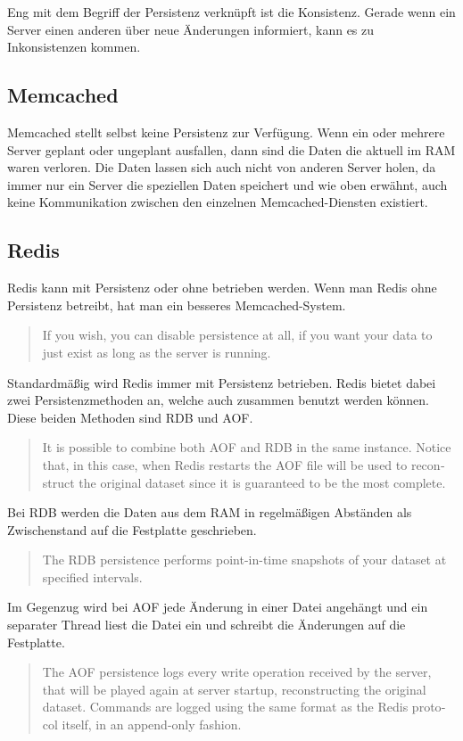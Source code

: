 Eng mit dem Begriff der Persistenz verknüpft ist die Konsistenz. Gerade wenn
ein Server einen anderen über neue Änderungen informiert, kann es zu
Inkonsistenzen kommen.

\subsection{Memcached}
Memcached stellt selbst keine Persistenz zur Verfügung. Wenn ein oder mehrere
Server geplant oder ungeplant ausfallen, dann sind die Daten die aktuell im
\gls{RAM} waren verloren. Die Daten lassen sich auch nicht von anderen Server
holen, da immer nur ein Server die speziellen Daten speichert und wie oben
erwähnt, auch keine Kommunikation zwischen den einzelnen Memcached-Diensten
existiert.

\subsection{Redis}
Redis kann mit Persistenz oder ohne betrieben werden. Wenn man Redis ohne
Persistenz betreibt, hat man ein besseres Memcached-System.

\foreignblockquote{english}[\cite{Redis2017}]{If you wish, you can
disable persistence at all, if you want your data to just exist as long as the
server is running.}

Standardmäßig wird Redis immer mit Persistenz betrieben. Redis bietet dabei
zwei Persistenzmethoden an, welche auch zusammen benutzt werden können. Diese
beiden Methoden sind \gls{RDB} und \gls{AOF}.

\foreignblockquote{english}[\cite{Redis2017}]{It is possible to combine both
AOF and RDB in the same instance. Notice that, in this case, when Redis
restarts the AOF file will be used to reconstruct the original dataset since it
is guaranteed to be the most complete.}

Bei \gls{RDB} werden die Daten aus dem \gls{RAM} in regelmäßigen Abständen als
Zwischenstand auf die Festplatte geschrieben.

\foreignblockquote{english}[\cite{Redis2017}]{The RDB persistence performs
point-in-time snapshots of your dataset at specified intervals.}

Im Gegenzug wird bei \gls{AOF} jede Änderung in einer Datei angehängt und ein
separater Thread liest die Datei ein und schreibt die Änderungen auf die
Festplatte.

\foreignblockquote{english}[\cite{Redis2017}]{The AOF persistence logs every
write operation received by the server, that will be played again at server
startup, reconstructing the original dataset. Commands are logged using the same
format as the Redis protocol itself, in an append-only fashion.}

